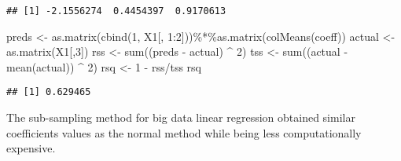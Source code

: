 \documentclass[
]{article}
\newenvironment{Shaded}{\begin{snugshade}}{\end{snugshade}}
\newcommand{\DecValTok}[1]{\textcolor[rgb]{0.00,0.00,0.81}{#1}}
\newcommand{\FunctionTok}[1]{\textcolor[rgb]{0.00,0.00,0.00}{#1}}
\newcommand{\NormalTok}[1]{#1}
\newcommand{\OtherTok}[1]{\textcolor[rgb]{0.56,0.35,0.01}{#1}}
\newcommand{\SpecialCharTok}[1]{\textcolor[rgb]{0.00,0.00,0.00}{#1}}
\begin{document}
\begin{verbatim}
## [1] -2.1556274  0.4454397  0.9170613
\end{verbatim}

\begin{Shaded}
\begin{Highlighting}[]
\NormalTok{preds }\OtherTok{\textless{}{-}} \FunctionTok{as.matrix}\NormalTok{(}\FunctionTok{cbind}\NormalTok{(}\DecValTok{1}\NormalTok{, X1[, }\DecValTok{1}\SpecialCharTok{:}\DecValTok{2}\NormalTok{]))}\SpecialCharTok{\%*\%}\FunctionTok{as.matrix}\NormalTok{(}\FunctionTok{colMeans}\NormalTok{(coeff))}
\NormalTok{actual }\OtherTok{\textless{}{-}} \FunctionTok{as.matrix}\NormalTok{(X1[,}\DecValTok{3}\NormalTok{])}
\NormalTok{rss }\OtherTok{\textless{}{-}} \FunctionTok{sum}\NormalTok{((preds }\SpecialCharTok{{-}}\NormalTok{ actual) }\SpecialCharTok{\^{}} \DecValTok{2}\NormalTok{)}
\NormalTok{tss }\OtherTok{\textless{}{-}} \FunctionTok{sum}\NormalTok{((actual }\SpecialCharTok{{-}} \FunctionTok{mean}\NormalTok{(actual)) }\SpecialCharTok{\^{}} \DecValTok{2}\NormalTok{)}
\NormalTok{rsq }\OtherTok{\textless{}{-}} \DecValTok{1} \SpecialCharTok{{-}}\NormalTok{ rss}\SpecialCharTok{/}\NormalTok{tss}
\NormalTok{rsq}
\end{Highlighting}
\end{Shaded}

\begin{verbatim}
## [1] 0.629465
\end{verbatim}

The sub-sampling method for big data linear regression obtained similar
coefficients values as the normal method while being less
computationally expensive.
\end{document}
